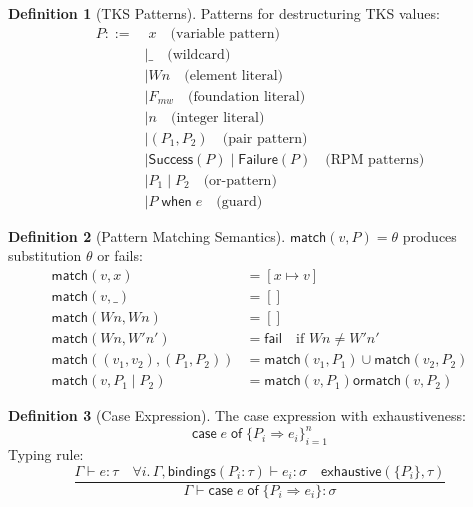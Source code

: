 \documentclass[11pt,twoside,openright]{book}
\theoremstyle{definition}
\newtheorem{definition}{Definition}[chapter]
\theoremstyle{plain}
\theoremstyle{remark}
\begin{document}
\begin{definition}[TKS Patterns]
\label{def:tks-patterns}
Patterns for destructuring TKS values:
\begin{align}
P ::=&\; x \quad \text{(variable pattern)} \\
    &\mid \_ \quad \text{(wildcard)} \\
    &\mid Wn \quad \text{(element literal)} \\
    &\mid F_{mw} \quad \text{(foundation literal)} \\
    &\mid n \quad \text{(integer literal)} \\
    &\mid (P_1, P_2) \quad \text{(pair pattern)} \\
    &\mid \mathsf{Success}(P) \mid \mathsf{Failure}(P) \quad \text{(RPM patterns)} \\
    &\mid P_1 \mid P_2 \quad \text{(or-pattern)} \\
    &\mid P\; \mathsf{when}\; e \quad \text{(guard)}
\end{align}
\end{definition}

\begin{definition}[Pattern Matching Semantics]
\label{def:pattern-sem}
$\mathsf{match}(v, P) = \theta$ produces substitution $\theta$ or fails:
\begin{align}
\mathsf{match}(v, x) &= [x \mapsto v] \\
\mathsf{match}(v, \_) &= [] \\
\mathsf{match}(Wn, Wn) &= [] \\
\mathsf{match}(Wn, W'n') &= \mathsf{fail} \quad \text{if } Wn \neq W'n' \\
\mathsf{match}((v_1, v_2), (P_1, P_2)) &= \mathsf{match}(v_1, P_1) \cup \mathsf{match}(v_2, P_2) \\
\mathsf{match}(v, P_1 \mid P_2) &= \mathsf{match}(v, P_1) \mathbin{\mathsf{or}} \mathsf{match}(v, P_2)
\end{align}
\end{definition}

\begin{definition}[Case Expression]
\label{def:case-expr}
The case expression with exhaustiveness:
\[
\mathsf{case}\; e\; \mathsf{of}\; \{P_i \Rightarrow e_i\}_{i=1}^n
\]
Typing rule:
\[
\frac{\Gamma \vdash e : \tau \quad \forall i.\, \Gamma, \mathsf{bindings}(P_i : \tau) \vdash e_i : \sigma \quad \mathsf{exhaustive}(\{P_i\}, \tau)}
{\Gamma \vdash \mathsf{case}\; e\; \mathsf{of}\; \{P_i \Rightarrow e_i\} : \sigma}
\]
\end{definition}
\end{document}
